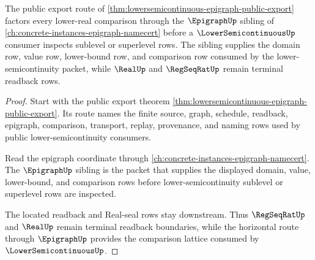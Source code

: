 \begin{theorem}
\label{thm:lower-semicontinuous-epigraph-sibling-route}
The public export route of \autoref{thm:lowersemicontinuous-epigraph-public-export} factors every lower-real comparison through the $\EpigraphUp$ sibling of \autoref{ch:concrete-instances-epigraph-namecert} before a $\LowerSemicontinuousUp$ consumer inspects sublevel or superlevel rows. The sibling supplies the domain row, value row, lower-bound row, and comparison row consumed by the lower-semicontinuity packet, while $\RealUp$ and $\RegSeqRatUp$ remain terminal readback rows.
\end{theorem}
\begin{proof}
Start with the public export theorem \autoref{thm:lowersemicontinuous-epigraph-public-export}. Its route names the finite source, graph, schedule, readback, epigraph, comparison, transport, replay, provenance, and naming rows used by public lower-semicontinuity consumers.

Read the epigraph coordinate through \autoref{ch:concrete-instances-epigraph-namecert}. The $\EpigraphUp$ sibling is the packet that supplies the displayed domain, value, lower-bound, and comparison rows before lower-semicontinuity sublevel or superlevel rows are inspected.

The located readback and Real-seal rows stay downstream. Thus $\RegSeqRatUp$ and $\RealUp$ remain terminal readback boundaries, while the horizontal route through $\EpigraphUp$ provides the comparison lattice consumed by $\LowerSemicontinuousUp$.
\end{proof}
